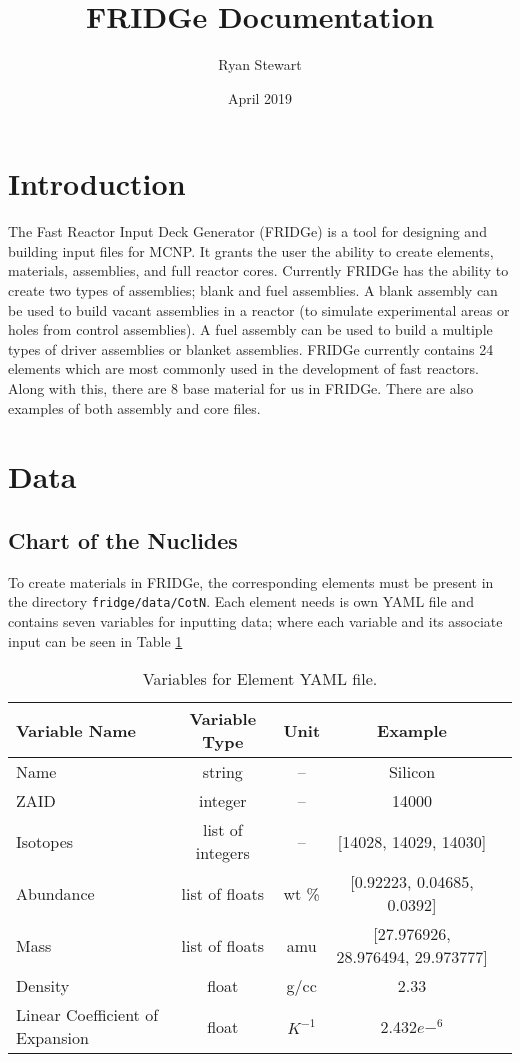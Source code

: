 \documentclass{article}
\title{FRIDGe Documentation}
\author{Ryan Stewart}
\date{April 2019}
\begin{document}
\maketitle

\section{Introduction}

The Fast Reactor Input Deck Generator (FRIDGe) is a tool for designing and building input files for MCNP. It grants the user the ability to create elements, materials, assemblies, and full reactor cores. Currently FRIDGe has the ability to create two types of assemblies; blank and fuel assemblies. A blank assembly can be used to build vacant assemblies in a reactor (to simulate experimental areas or holes from control assemblies). A fuel assembly can be used to build a multiple types of driver assemblies or blanket assemblies. FRIDGe currently contains 24 elements which are most commonly used in the development of fast reactors. Along with this, there are 8 base material for us in FRIDGe. There are also examples of both assembly and core files.

\section{Data}

\subsection{Chart of the Nuclides}

To create materials in FRIDGe, the corresponding elements must be present in the directory \verb|fridge/data/CotN|. Each element needs is own YAML file and contains seven variables for inputting data; where each variable and its associate input can be seen in Table \ref{tab:element}

\begin{table}
	\centering
	\caption{Variables for Element YAML file.}
	\begin{tabular}{lcccc}\toprule
		Variable Name   & Variable Type & Unit & Example 
		\\
		\hline
		Name  & string & -- & Silicon
		\\
		ZAID & integer &-- & 14000
		\\
	    Isotopes & list of integers & --& [14028, 14029, 14030]
		\\
		Abundance & list of floats & wt \% & [0.92223, 0.04685, 0.0392]
		\\
		Mass & list of floats &  amu & [27.976926, 28.976494, 29.973777]
		\\
		Density & float & g/cc & 2.33
		\\
		Linear Coefficient of Expansion & float & $K^{-1}$ & 2.432$e-^6$
		\\
		\bottomrule
	\end{tabular}
	\label{tab:element}
\end{table}
\end{document}
